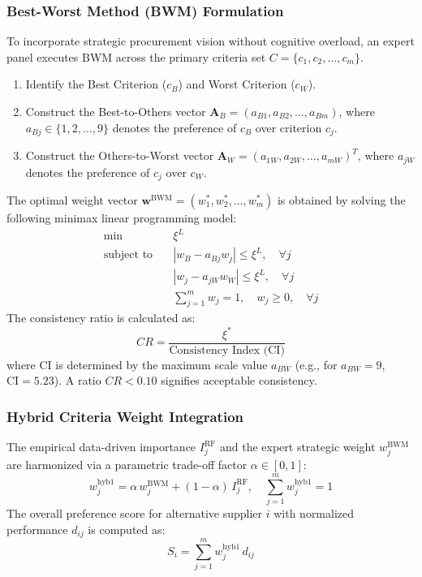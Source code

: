 \documentclass[twocolumn,10pt]{article}
\begin{document}
\subsubsection{Best-Worst Method (BWM) Formulation}
To incorporate strategic procurement vision without cognitive overload, an expert panel executes BWM across the primary criteria set $C = \{c_1, c_2, \dots, c_m\}$.
\begin{enumerate}
    \item Identify the Best Criterion ($c_B$) and Worst Criterion ($c_W$).
    \item Construct the Best-to-Others vector $\mathbf{A}_B = (a_{B1}, a_{B2}, \dots, a_{Bm})$, where $a_{Bj} \in \{1, 2, \dots, 9\}$ denotes the preference of $c_B$ over criterion $c_j$.
    \item Construct the Others-to-Worst vector $\mathbf{A}_W = (a_{1W}, a_{2W}, \dots, a_{mW})^T$, where $a_{jW}$ denotes the preference of $c_j$ over $c_W$.
\end{enumerate}

The optimal weight vector $\mathbf{w}^{\text{BWM}} = (w_1^*, w_2^*, \dots, w_m^*)$ is obtained by solving the following minimax linear programming model:
\begin{align}
    \min \quad & \xi^L \label{eq:bwm_obj} \\
    \text{subject to} \quad & |w_B - a_{Bj} w_j| \le \xi^L, \quad \forall j \label{eq:bwm_c1} \\
    & |w_j - a_{jW} w_W| \le \xi^L, \quad \forall j \label{eq:bwm_c2} \\
    & \sum_{j=1}^m w_j = 1, \quad w_j \ge 0, \quad \forall j \label{eq:bwm_c3}
\end{align}
The consistency ratio is calculated as:
\begin{equation}
    CR = \frac{\xi^*}{\text{Consistency Index (CI)}}
    \label{eq:bwm_cr}
\end{equation}
where $\text{CI}$ is determined by the maximum scale value $a_{BW}$ (e.g., for $a_{BW}=9$, $\text{CI}=5.23$). A ratio $CR < 0.10$ signifies acceptable consistency.

\subsubsection{Hybrid Criteria Weight Integration}
The empirical data-driven importance $I_j^{\text{RF}}$ and the expert strategic weight $w_j^{\text{BWM}}$ are harmonized via a parametric trade-off factor $\alpha \in [0, 1]$:
\begin{equation}
    w_j^{\text{hyb1}} = \alpha \, w_j^{\text{BWM}} + (1 - \alpha) \, I_j^{\text{RF}}, \quad \sum_{j=1}^m w_j^{\text{hyb1}} = 1
    \label{eq:rf_bwm_fusion}
\end{equation}
The overall preference score for alternative supplier $i$ with normalized performance $d_{ij}$ is computed as:
\begin{equation}
    S_i = \sum_{j=1}^m w_j^{\text{hyb1}} \, d_{ij}
    \label{eq:score_rf_bwm}
\end{equation}
\end{document}
